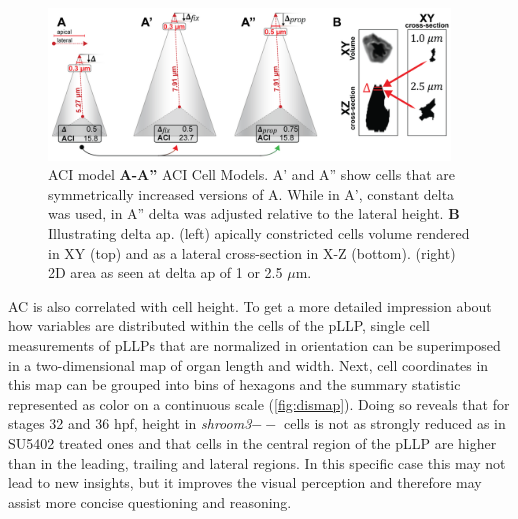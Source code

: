 \documentclass[11pt,singlespacinge,twoside]{reedthesis} %
\begin{document}
\begin{figure}

{\centering \includegraphics[width=0.95\textwidth]{figures/summary/aci_fig-01} 

}

\caption[ACI model]{ACI model \textbf{A-A''} ACI Cell Models. A' and A'' show cells that are symmetrically increased versions of A. While in A', constant delta was used, in A'' delta was adjusted relative to the lateral height. \textbf{B} Illustrating delta ap. (left) apically constricted cells volume rendered in XY (top) and as a lateral cross-section in X-Z (bottom). (right) 2D area as seen at delta ap of 1 or 2.5 \(\mu\)m.}\label{fig:disaci}
\end{figure}
AC is also correlated with cell height. To get a more detailed impression about how variables are distributed within the cells of the pLLP, single cell measurements of pLLPs that are normalized in orientation can be superimposed in a two-dimensional map of organ length and width. Next, cell coordinates in this map can be grouped into bins of hexagons and the summary statistic represented as color on a continuous scale (\ref{fig:dismap}). Doing so reveals that for stages 32 and 36 hpf, height in \emph{shroom3}\(--\) cells is not as strongly reduced as in SU5402 treated ones and that cells in the central region of the pLLP are higher than in the leading, trailing and lateral regions. In this specific case this may not lead to new insights, but it improves the visual perception and therefore may assist more concise questioning and reasoning.
\end{document}
